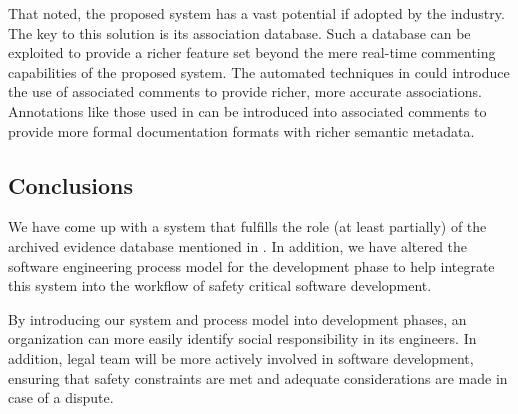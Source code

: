 That noted, the proposed system has a vast potential if adopted by the industry.
The key to this solution is its association database. Such a database can be
exploited to provide a richer feature set beyond the mere real-time commenting 
capabilities of the proposed system. The automated techniques in 
\cite{Antoniol1999, Antoniol2000} could introduce the use of associated comments
to provide richer, more accurate associations. Annotations like those used in
\cite{Javadoc} can be introduced into associated comments to provide more formal
documentation formats with richer semantic metadata.

\subsection{Conclusions}
We have come up with a system that fulfills the role (at least partially) of the
archived evidence database mentioned in \cite{Turner2001}. In addition, we have
altered the software engineering process model for the development phase to help
integrate this system into the workflow of safety critical software development.

By introducing our system and process model into development phases, an
organization can more easily identify social responsibility in its engineers. In
addition, legal team will be more actively involved in software development,
ensuring that safety constraints are met and adequate considerations are made in
case of a dispute.
